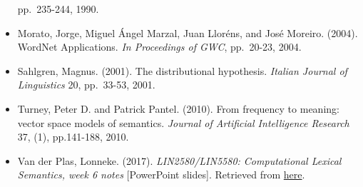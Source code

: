 \documentclass[11pt]{article}
\begin{document}
\begin{itemize}
  pp.~235-244, 1990.\\
\item
  Morato, Jorge, Miguel Ángel Marzal, Juan Lloréns, and José Moreiro.
  (2004). WordNet Applications. \emph{In Proceedings of GWC}, pp.~20-23,
  2004.\\
\item
  Sahlgren, Magnus. (2001). The distributional hypothesis. \emph{Italian
  Journal of Linguistics} 20, pp.~33-53, 2001.\\
\item
  Turney, Peter D. and Patrick Pantel. (2010). From frequency to
  meaning: vector space models of semantics. \emph{Journal of Artificial
  Intelligence Research} 37, (1), pp.141-188, 2010.\\
\item
  Van der Plas, Lonneke. (2017). \emph{LIN2580/LIN5580: Computational
  Lexical Semantics, week 6 notes} {[}PowerPoint slides{]}. Retrieved
  from
  \href{https://www.um.edu.mt/vle/pluginfile.php/272004/mod_resource/content/5/CompLexSemLect6.pdf}{here}.
\end{itemize}


    
    
    
    
\end{document}
